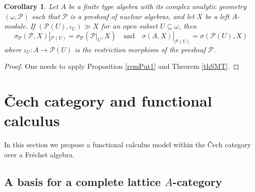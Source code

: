 \documentclass[12pt]{amsart}%
\theoremstyle{plain}
\newtheorem{corollary}{Corollary}
\numberwithin{equation}{section}
\numberwithin{equation}{section}
\numberwithin{theorem}{section}
\numberwithin{lemma}{section}
\numberwithin{remark}{section}
\numberwithin{example}{section}
\numberwithin{proposition}{section}
\numberwithin{definition}{section}
\numberwithin{corollary}{section}
\begin{document}
\begin{corollary}
\label{corM2}Let $A$ be a finite type algebra with its complex analytic
geometry $\left(  \omega,\mathcal{P}\right)  $ such that $\mathcal{P}$ is a
presheaf of nuclear algebras, and let $X$ be a left $A$-module. If $\left(
\mathcal{P}\left(  U\right)  ,\iota_{U}\right)  \gg X$ for an open subset
$U\subseteq\omega$, then
\[
\sigma_{\operatorname{P}}\left(  \mathcal{P},X\right)  |_{\mathcal{P}\left(
U\right)  }=\sigma_{\operatorname{P}}\left(  \mathcal{P}|_{U},X\right)
\quad\text{and}\quad\sigma\left(  A,X\right)  |_{\mathcal{P}\left(  U\right)
}=\sigma\left(  \mathcal{P}\left(  U\right)  ,X\right)
\]
where $\iota_{U}:A\rightarrow\mathcal{P}\left(  U\right)  $ is the restriction
morphism of the presheaf $\mathcal{P}$.
\end{corollary}

\begin{proof}
One needs to apply Proposition \ref{remPut1} and Theorem \ref{thSMT}.
\end{proof}

\section{\v{C}ech category and functional calculus}

In this section we propose a functional calculus model within the \v{C}ech
category over a Fr\'{e}chet algebra.

\subsection{A basis for a complete lattice $A$-category\label{subsecTBC}}
\end{document}

